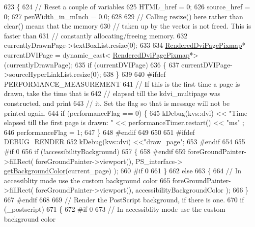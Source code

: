 \begin{DoxyCode}
623 \{
624   \textcolor{comment}{// Reset a couple of variables}
625   HTML\_href         = 0;
626   source\_href       = 0;
627   penWidth\_in\_mInch = 0.0;
628 
629   \textcolor{comment}{// Calling resize() here rather than clear() means that the memory}
630   \textcolor{comment}{// taken up by the vector is not freed. This is faster than}
631   \textcolor{comment}{// constantly allocating/freeing memory.}
632   currentlyDrawnPage->textBoxList.resize(0);
633 
634   \hyperlink{dviPageInfo_8h_ac16fb3ec8d590bf2412bda0e176a2e65}{RenderedDviPagePixmap}* currentDVIPage = \textcolor{keyword}{dynamic\_cast<}
      \hyperlink{dviPageInfo_8h_ac16fb3ec8d590bf2412bda0e176a2e65}{RenderedDviPagePixmap}*\textcolor{keyword}{>}(currentlyDrawnPage);
635   \textcolor{keywordflow}{if} (currentDVIPage)
636   \{
637     currentDVIPage->sourceHyperLinkList.resize(0);
638   \}
639 
640 \textcolor{preprocessor}{#ifdef PERFORMANCE\_MEASUREMENT}
641   \textcolor{comment}{// If this is the first time a page is drawn, take the time that is}
642   \textcolor{comment}{// elapsed till the kdvi\_multipage was constructed, and print}
643   \textcolor{comment}{// it. Set the flag so that is message will not be printed again.}
644   \textcolor{keywordflow}{if} (performanceFlag == 0) \{
645     kDebug(kvs::dvi) << \textcolor{stringliteral}{"Time elapsed till the first page is drawn: "} << performanceTimer.restart() << \textcolor{stringliteral}{"ms"}
      ;
646     performanceFlag = 1;
647   \}
648 \textcolor{preprocessor}{#endif}
649 
650 
651 \textcolor{preprocessor}{#ifdef DEBUG\_RENDER}
652   kDebug(kvs::dvi) <<\textcolor{stringliteral}{"draw\_page"};
653 \textcolor{preprocessor}{#endif}
654 
655 \textcolor{preprocessor}{#if 0}
656   \textcolor{keywordflow}{if} (!accessibilityBackground)
657   \{
658 \textcolor{preprocessor}{#endif}
659     foreGroundPainter->fillRect( foreGroundPainter->viewport(), PS\_interface->
      \hyperlink{classghostscript__interface_aa43188e3c387cb97e584a364bc7b3b6a}{getBackgroundColor}(current\_page) );
660 \textcolor{preprocessor}{#if 0}
661   \}
662   \textcolor{keywordflow}{else}
663   \{
664     \textcolor{comment}{// In accessiblity mode use the custom background color}
665     foreGroundPainter->fillRect( foreGroundPainter->viewport(), accessibilityBackgroundColor );
666   \}
667 \textcolor{preprocessor}{#endif}
668 
669   \textcolor{comment}{// Render the PostScript background, if there is one.}
670   \textcolor{keywordflow}{if} (\_postscript)
671   \{
672 \textcolor{preprocessor}{#if 0}
673     \textcolor{comment}{// In accessiblity mode use the custom background color}

\end{DoxyCode}
